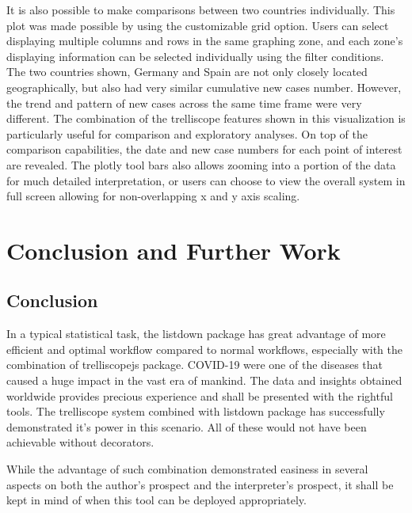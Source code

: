 \documentclass[
]{article}
\begin{document}
It is also possible to make comparisons between two countries
individually. This plot was made possible by using the customizable grid
option. Users can select displaying multiple columns and rows in the
same graphing zone, and each zone's displaying information can be
selected individually using the filter conditions. The two countries
shown, Germany and Spain are not only closely located geographically,
but also had very similar cumulative new cases number. However, the
trend and pattern of new cases across the same time frame were very
different. The combination of the trelliscope features shown in this
visualization is particularly useful for comparison and exploratory
analyses. On top of the comparison capabilities, the date and new case
numbers for each point of interest are revealed. The plotly tool bars
also allows zooming into a portion of the data for much detailed
interpretation, or users can choose to view the overall system in full
screen allowing for non-overlapping x and y axis scaling.

\hypertarget{conclusion-and-further-work}{%
\section{Conclusion and Further
Work}\label{conclusion-and-further-work}}

\hypertarget{conclusion}{%
\subsection{Conclusion}\label{conclusion}}

In a typical statistical task, the listdown package has great advantage
of more efficient and optimal workflow compared to normal workflows,
especially with the combination of trelliscopejs package. COVID-19 were
one of the diseases that caused a huge impact in the vast era of
mankind. The data and insights obtained worldwide provides precious
experience and shall be presented with the rightful tools. The
trelliscope system combined with listdown package has successfully
demonstrated it's power in this scenario. All of these would not have
been achievable without decorators.

While the advantage of such combination demonstrated easiness in several
aspects on both the author's prospect and the interpreter's prospect, it
shall be kept in mind of when this tool can be deployed appropriately.
\end{document}
